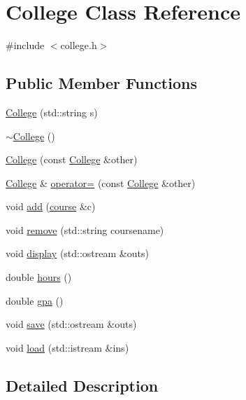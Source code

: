 \hypertarget{class_college}{}\section{College Class Reference}
\label{class_college}


{\ttfamily \#include $<$college.\+h$>$}

\subsection*{Public Member Functions}
\begin{DoxyCompactItemize}
\item 
\hyperlink{class_college_adabaf4087355e83f9f7d39f1e1498b41}{College} (std\+::string s)
\item 
\hyperlink{class_college_a42fcce4f87439592eaefd96564a796a8}{$\sim$\+College} ()
\item 
\hyperlink{class_college_ad007ad488e5a7ef986114080d0c8e101}{College} (const \hyperlink{class_college}{College} \&other)
\item 
\hyperlink{class_college}{College} \& \hyperlink{class_college_af2194c9b37f80d13dc3fdba6784b18e8}{operator=} (const \hyperlink{class_college}{College} \&other)
\item 
void \hyperlink{class_college_a67fd1d8970b46b24ce2e0dd72598a22f}{add} (\hyperlink{classcourse}{course} \&c)
\item 
void \hyperlink{class_college_a4d2ae513b36e6421fb1ca2c08459cfe6}{remove} (std\+::string coursename)
\item 
void \hyperlink{class_college_a52ca0a164483cf5c05591cd0fb8b300c}{display} (std\+::ostream \&outs)
\item 
double \hyperlink{class_college_a8a7a762611a1d7e00c453390d49355fd}{hours} ()
\item 
double \hyperlink{class_college_aaf9bfaa0bc717e96da6365661a96fcd0}{gpa} ()
\item 
void \hyperlink{class_college_af6b419f813bc990c0e11f99b78a26899}{save} (std\+::ostream \&outs)
\item 
void \hyperlink{class_college_a11422094ddd907705daede7aa537dd73}{load} (std\+::istream \&ins)
\end{DoxyCompactItemize}


\subsection{Detailed Description}

